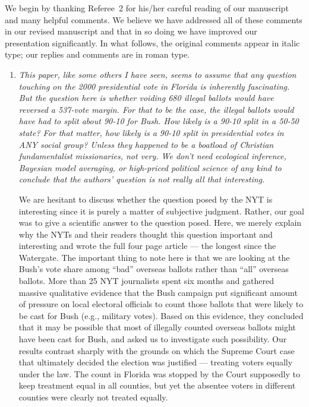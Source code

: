 \documentclass[11pt]{article}
\begin{document}
We begin by thanking Referee~2 for his/her careful reading of our
manuscript and many helpful comments. We believe we have addressed all
of these comments in our revised manuscript and that in so doing we
have improved our presentation significantly.  In what follows, the
original comments appear in italic type; our replies and comments are
in roman type.

\bigskip


\begin{enumerate}
\item {\it This paper, like some others I have seen, seems to assume
    that any question touching on the 2000 presidential vote in
    Florida is inherently fascinating.  But the question here is
    whether voiding 680 illegal ballots would have reversed a 537-vote
    margin.  For that to be the case, the illegal ballots would have
    had to split about 90-10 for Bush.  How likely is a 90-10 split in
    a 50-50 state?  For that matter, how likely is a 90-10 split in
    presidential votes in ANY social group?  Unless they happened to
    be a boatload of Christian fundamentalist missionaries, not very.
    We don't need ecological inference, Bayesian model averaging, or
    high-priced political science of any kind to conclude that the
    authors' question is not really all that interesting.}
  
  We are hesitant to discuss whether the question posed by the NYT is
  interesting since it is purely a matter of subjective judgment.
  Rather, our goal was to give a scientific answer to the question
  posed. Here, we merely explain why the NYTs and their readers
  thought this question important and interesting and wrote the full
  four page article --- the longest since the Watergate. The important
  thing to note here is that we are looking at the Bush's vote share
  among ``bad'' overseas ballots rather than ``all'' overseas ballots.
  More than 25 NYT journalists spent six months and gathered massive
  qualitative evidence that the Bush campaign put significant amount
  of pressure on local electoral officials to count those ballots that
  were likely to be cast for Bush (e.g., military votes).  Based on
  this evidence, they concluded that it may be possible that most of
  illegally counted overseas ballots might have been cast for Bush,
  and asked us to investigate such possibility.  Our results contrast
  sharply with the grounds on which the Supreme Court case that
  ultimately decided the election was justified --- treating voters
  equally under the law.  The count in Florida was stopped by the
  Court supposedly to keep treatment equal in all counties, but yet
  the absentee voters in different counties were clearly not treated
  equally.
  

\end{enumerate}
\end{document}
